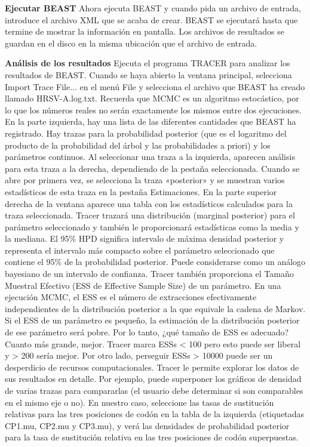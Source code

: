 \textbf{Ejecutar BEAST}
Ahora ejecuta BEAST y cuando pida un archivo de entrada, introduce el archivo XML que se acaba de crear. BEAST se ejecutará hasta que termine de mostrar la información en pantalla. Los archivos de resultados se guardan en el disco en la misma ubicación que el archivo de entrada.

\textbf{Análisis de los resultados}
Ejecuta el programa TRACER para analizar los resultados de BEAST. Cuando se haya abierto la ventana principal, selecciona Import Trace File... en el menú File y selecciona el archivo que BEAST ha creado llamado HRSV-A.log.txt. Recuerda que MCMC es un algoritmo estocástico, por lo que los números reales no serán exactamente los mismos entre dos ejecuciones. En la parte izquierda, hay una lista de las diferentes cantidades que BEAST ha registrado. Hay trazas para la probabilidad posterior (que es el logaritmo del producto de la probabilidad del árbol y las probabilidades a priori) y los parámetros continuos. Al seleccionar una traza a la izquierda, aparecen análisis para esta traza a la derecha, dependiendo de la pestaña seleccionada. Cuando se abre por primera vez, se selecciona la traza «posterior» y se muestran varios estadísticos de esta traza en la pestaña Estimaciones. En la parte superior derecha de la ventana aparece una tabla con los estadísticos calculados para la traza seleccionada. Tracer trazará una distribución (marginal posterior) para el parámetro seleccionado y también le proporcionará estadísticas como la media y la mediana. El 95\% HPD significa intervalo de máxima densidad posterior y representa el intervalo más compacto sobre el parámetro seleccionado que contiene el 95\% de la probabilidad posterior. Puede considerarse como un análogo bayesiano de un intervalo de confianza. Tracer también proporciona el Tamaño Muestral Efectivo (ESS de Effective Sample Size) de un parámetro. En una ejecución MCMC, el ESS es el número de extracciones efectivamente independientes de la distribución posterior a la que equivale la cadena de Markov. Si el ESS de un parámetro es pequeño, la estimación de la distribución posterior de ese parámetro será pobre. Por lo tanto, ¿qué tamaño de ESS es adecuado? Cuanto más grande, mejor. Tracer marca ESSs < 100 pero esto puede ser liberal y > 200 sería mejor. Por otro lado, perseguir ESSs > 10000 puede ser un desperdicio de recursos computacionales. Tracer le permite explorar los datos de sus resultados en detalle. Por ejemplo, puede superponer los gráficos de densidad de varias trazas para compararlas (el usuario debe determinar si son comparables en el mismo eje o no). En nuestro caso, seleccione las tasas de sustitución relativas para las tres posiciones de codón en la tabla de la izquierda (etiquetadas CP1.mu, CP2.mu y CP3.mu), y verá las densidades de probabilidad posterior para la tasa de sustitución relativa en las tres posiciones de codón superpuestas.

